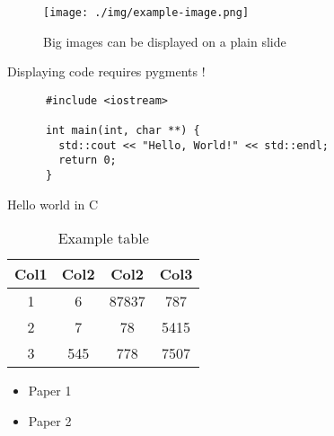 
\begin{plainslide}
  \begin{figure}[H]
    \begin{center}
      \texttt{[image: ./img/example-image.png]}
      \caption{Big images can be displayed on a plain slide}
    \end{center}
  \end{figure}
\end{plainslide}


\begin{subsectionslide}[containsverbatim]
  Displaying code requires pygments !

  \begin{listing}[H]
    \begin{verbatim}
      #include <iostream>

      int main(int, char **) {
        std::cout << "Hello, World!" << std::endl;
        return 0;
      }
    \end{verbatim}
    \caption{Hello world in C}
  \end{listing}

\end{subsectionslide}


\begin{subsectionslide}

  \begin{center}
    \begin{table}
      \begin{tabular}{|c|c|c|c|}
       \hline
       \rowcolor{tableFirstRowColor} Col1 & Col2 & Col2 & Col3 \\ [0.5ex]
       \hline
       \cellcolor{tableFirstColColor} 1 & 6 & 87837 & 787 \\
       \hline
       \cellcolor{tableFirstColColor} 2 & 7 & 78 & 5415 \\
       \hline
       \cellcolor{tableFirstColColor} 3 & 545 & 778 & 7507 \\
       \hline
      \end{tabular}
      \caption{Example table}
    \end{table}
  \end{center}

\end{subsectionslide}


\begin{subsectionslide}
  \begin{itemize}
    \item Paper 1 \cite{blattner2017model}
    \item Paper 2 \cite{bardakoff2020hedgehog}
  \end{itemize}
\end{subsectionslide}
